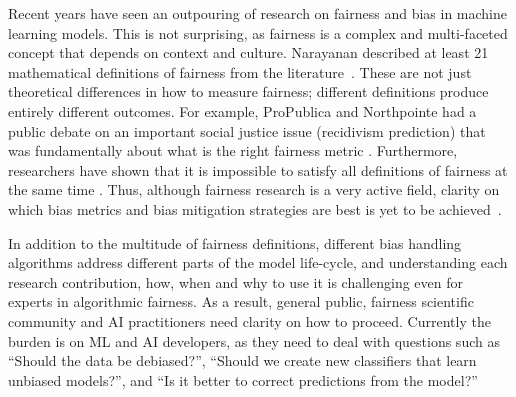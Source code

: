 \documentclass{article}
\begin{document}

Recent years have seen an outpouring of research on fairness and bias in machine learning models. This is not surprising, as fairness is a complex and multi-faceted concept that depends on context and culture.  Narayanan described at least 21 mathematical definitions of fairness from the literature~\cite{Narayanan2018}.
These are not just theoretical differences in how to measure fairness; different definitions produce entirely different outcomes. For example, ProPublica and Northpointe had a public debate on an important social justice issue (recidivism prediction) that was fundamentally about what is the right fairness metric \citep{Larson2016, Dieterich2016,Larson2016a}. Furthermore,  researchers have shown that it is impossible to satisfy all definitions of fairness at the same time \cite{kleinberg2017fairness}.  Thus, although fairness research is a very active field, clarity on which bias metrics and bias mitigation strategies are best is yet to be achieved~\cite{Freidler2018}.

In addition to the multitude of fairness definitions, different bias handling algorithms address different parts of the model life-cycle, and understanding each research contribution, how, when and why to use it is challenging even for experts in algorithmic fairness. As a result, general public, fairness scientific community and AI practitioners need clarity on how to proceed. Currently the burden is on ML and AI developers, as they need to deal with questions such as ``Should the data be debiased?'', ``Should we create new classifiers that learn unbiased models?'', and ``Is it better to correct predictions from the model?'' 
\end{document}
